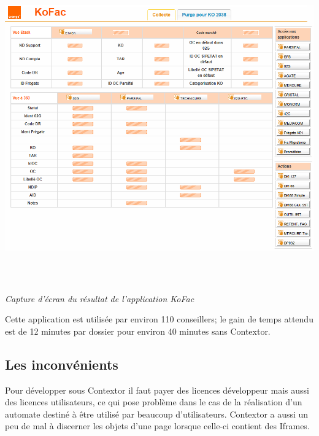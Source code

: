 \documentclass[a4paper,twoside,12pt,openright]{report}
\begin{document}
\begin{center}
\includegraphics[height=14cm]{Res_KoFac.PNG}\\
\itshape Capture d'écran du résultat de l'application KoFac
\end{center}
\vspace{1cm}
Cette application est utilisée par environ 110 conseillers; le gain de temps attendu est de 12 minutes par dossier pour environ 40 minutes sans Contextor.
\subsection{Les inconvénients}
Pour développer sous Contextor il faut payer des licences développeur mais aussi des licences utilisateurs, ce qui pose problème dans le cas de la réalisation d'un automate destiné à être utilisé par beaucoup d'utilisateurs.
Contextor a aussi un peu de mal à discerner les objets d'une page lorsque celle-ci contient des Iframes.
\end{document}
